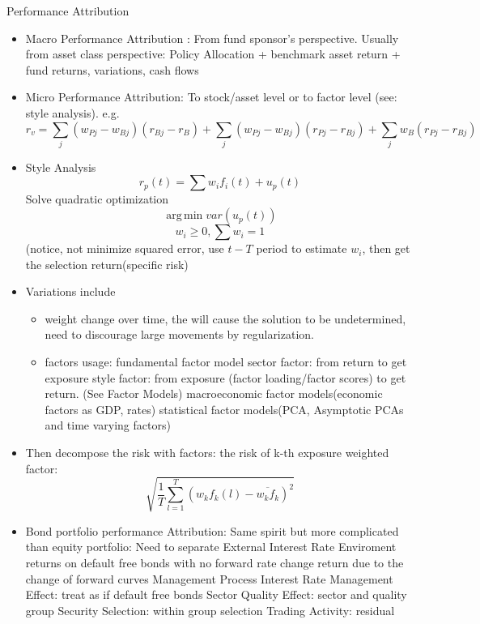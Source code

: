 \documentclass[11pt, openany]{book}              %
\DeclareMathOperator*{\argmin}{arg\,min}  %
\begin{document}
Performance Attribution

\begin{itemize}	

 \item Macro Performance Attribution : From fund sponsor's perspective. 
 	\subitem Usually from asset class perspective: Policy Allocation + benchmark asset return + fund returns, variations, cash flows
 \item Micro Performance Attribution: To stock/asset level or to factor level (see: style analysis).
 e.g.
 $$r_v = \sum_j(w_{Pj} - w_{Bj})(r_{Bj}- r_B) + \sum _j(w_{Pj} - w_{Bj})(r_{Pj} - r_{Bj}) + \sum_j w_B (r_{Pj} - r_{Bj}) $$
 \item Style Analysis
 	$$r_p(t) = \sum w_i f_i(t) + u_p(t)$$
 	Solve quadratic optimization
 	$$\argmin var(u_p(t))$$
 	$$w_i \geq 0, \sum w_i = 1$$
 	(notice, not minimize squared error, use $t-T$ period to estimate $w_i$, then get the selection return(specific risk) \\
  \item Variations include
  
    \begin{itemize}
  	\item weight change over time, the will cause the solution to be undetermined, need to discourage large movements by regularization. 
  	\item factors usage: 
  	\subitem  fundamental factor model 
  		\subsubitem sector factor: from return to get exposure
  		\subsubitem style factor: from exposure (factor loading/factor scores) to get return. (See Factor Models)
  	\subitem macroeconomic factor models(economic factors as GDP, rates)
  	\subitem statistical factor models(PCA, Asymptotic PCAs and time varying factors) 
  \end{itemize} 
  
  \item Then decompose the risk with factors: the risk of k-th exposure weighted factor: $$\sqrt{\frac{1}{T}\sum_{l=1}^T (w_k f_k(l) - \overline{w_k f_k})^2}$$
  \item Bond portfolio performance Attribution: Same spirit but more complicated than equity portfolio: Need to separate 
  	\subitem External Interest Rate Enviroment
  	  	\subsubitem returns on default free bonds with no forward rate change
  		\subsubitem return due to the change of forward curves
  	\subitem Management Process
  		\subsubitem Interest Rate Management Effect: treat as if default free bonds
  		\subsubitem Sector Quality Effect: sector and quality group
  		\subsubitem Security Selection: within group selection
  		\subsubitem Trading Activity: residual
\end{itemize}
\end{document}
